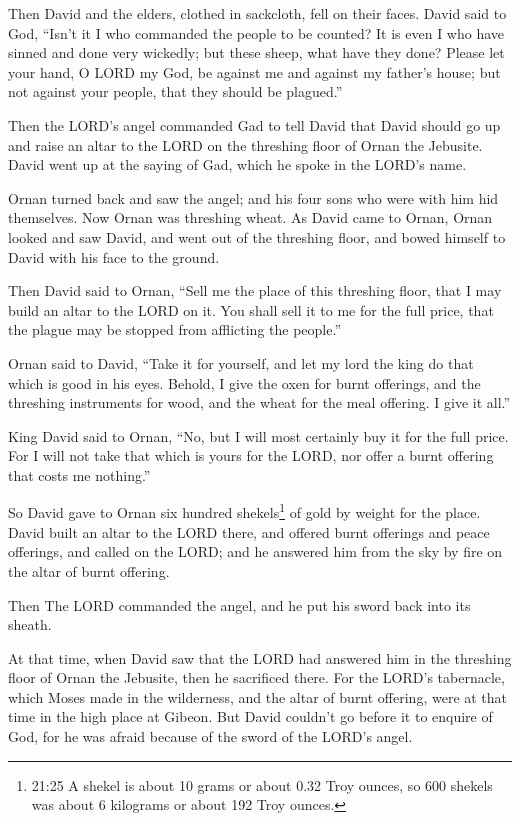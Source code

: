 Then David and the elders, clothed in sackcloth, fell on their faces.
 David said to God, ``Isn't it I who commanded the people
to be counted? It is even I who have sinned and done very wickedly; but
these sheep, what have they done? Please let your hand, O LORD my God,
be against me and against my father's house; but not against your
people, that they should be plagued.''

 Then the LORD's angel commanded Gad to tell David that
David should go up and raise an altar to the LORD on the threshing floor
of Ornan the Jebusite.  David went up at the saying of Gad,
which he spoke in the LORD's name.

 Ornan turned back and saw the angel; and his four sons who
were with him hid themselves. Now Ornan was threshing wheat.
 As David came to Ornan, Ornan looked and saw David, and
went out of the threshing floor, and bowed himself to David with his
face to the ground.

 Then David said to Ornan, ``Sell me the place of this
threshing floor, that I may build an altar to the LORD on it. You shall
sell it to me for the full price, that the plague may be stopped from
afflicting the people.''

 Ornan said to David, ``Take it for yourself, and let my
lord the king do that which is good in his eyes. Behold, I give the oxen
for burnt offerings, and the threshing instruments for wood, and the
wheat for the meal offering. I give it all.''

 King David said to Ornan, ``No, but I will most certainly
buy it for the full price. For I will not take that which is yours for
the LORD, nor offer a burnt offering that costs me nothing.''

 So David gave to Ornan six hundred shekels\footnote{21:25
  A shekel is about 10 grams or about 0.32 Troy ounces, so 600 shekels
  was about 6 kilograms or about 192 Troy ounces.} of gold by weight for
the place.  David built an altar to the LORD there, and
offered burnt offerings and peace offerings, and called on the LORD; and
he answered him from the sky by fire on the altar of burnt offering.

 Then The LORD commanded the angel, and he put his sword
back into its sheath.

 At that time, when David saw that the LORD had answered
him in the threshing floor of Ornan the Jebusite, then he sacrificed
there.  For the LORD's tabernacle, which Moses made in the
wilderness, and the altar of burnt offering, were at that time in the
high place at Gibeon.  But David couldn't go before it to
enquire of God, for he was afraid because of the sword of the LORD's
angel.

